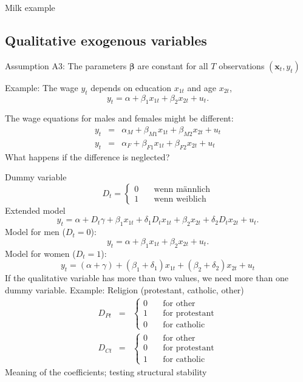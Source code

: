 \documentclass{article}
\begin{document}
Milk example

\subsection*{Qualitative exogenous variables}

Assumption A3: The parameters $\mathbf{\beta }$ are constant for all $T$ observations $(\mathbf{x}_{t},y_{t})$

Example: The wage $y_{t}$ depends on education $x_{1t}$ and age $x_{2t}$,
\[ y_{t}=\alpha +\beta _{1}x_{1t}+\beta _{2}x_{2t}+u_{t}. \]

The wage equations for males and females might be different:
\begin{eqnarray*}
y_{t} &=&\alpha _{M}+\beta _{M1}x_{1t}+\beta _{M2}x_{2t}+u_{t} \\
y_{t} &=&\alpha _{F}+\beta _{F1}x_{1t}+\beta _{F2}x_{2t}+u_{t}
\end{eqnarray*}
What happens if the difference is neglected?

Dummy variable
\[ D_{t}=\left\{ 
\begin{array}{ll}
0 & \quad \text{wenn männlich} \\ 
1 & \quad \text{wenn weiblich}
\end{array} \right. \]
Extended model
\[ y_{t}=\alpha +D_{t}\gamma +\beta _{1}x_{1t}+\delta _{1}D_{t}x_{1t}
+\beta_{2}x_{2t}+\delta _{2}D_{t}x_{2t}+u_{t}. \]
Model for men ($D_{t}=0$):
\[ y_{t}=\alpha +\beta _{1}x_{1t}+\beta _{2}x_{2t}+u_{t}. \]
Model for women ($D_{t}=1$):
\[ y_{t}=\left( \alpha +\gamma \right) +\left( \beta _{1}+\delta _{1}\right)
x_{1t}+\left( \beta _{2}+\delta _{2}\right) x_{2t}+u_{t} \]
If the qualitative variable has more than two values, we need more
than one dummy variable. Example:  Religion (protestant, catholic, other)
\begin{eqnarray*}
D_{Pt} &=&\left\{ 
\begin{array}{ll}
0 & \quad \text{for other} \\ 
1 & \quad \text{for protestant} \\ 
0 & \quad \text{for catholic}
\end{array}%
\right. \\
D_{Ct} &=&\left\{ 
\begin{array}{ll}
0 & \quad \text{for other} \\ 
0 & \quad \text{for protestant} \\ 
1 & \quad \text{for catholic}
\end{array} \right.
\end{eqnarray*}
Meaning of the coefficients; testing structural stability
\end{document}
